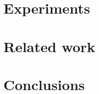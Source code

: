 \documentclass[aoas,preprint,authoryear]{imsart}
\begin{document}
\section{Experiments}

\section{Related work}

\section{Conclusions}




\end{document}
